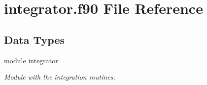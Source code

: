 \hypertarget{integrator_8f90}{\section{integrator.\-f90 File Reference}
\label{integrator_8f90}
}
\subsection*{Data Types}
\begin{DoxyCompactItemize}
\item 
module \hyperlink{classintegrator}{integrator}
\begin{DoxyCompactList}\small\item\em Module with the integration routines. \end{DoxyCompactList}\end{DoxyCompactItemize}

